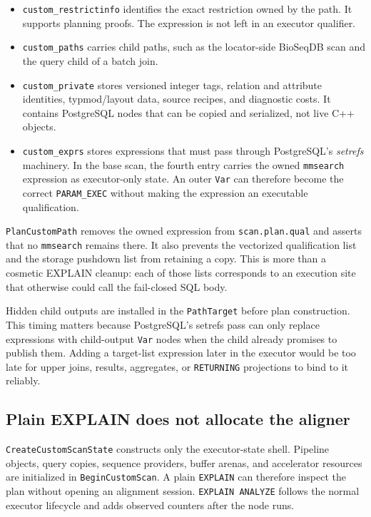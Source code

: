\begin{itemize}
  \item \texttt{custom\_restrictinfo} identifies the exact restriction owned
  by the path.  It supports planning proofs.  The expression is not left in an
  executor qualifier.
  \item \texttt{custom\_paths} carries child paths, such as the locator-side
  BioSeqDB scan and the query child of a batch join.
  \item \texttt{custom\_private} stores versioned integer tags, relation and
  attribute identities, typmod/layout data, source recipes, and diagnostic
  costs.  It contains PostgreSQL nodes that can be copied and serialized, not
  live C++ objects.
  \item \texttt{custom\_exprs} stores expressions that must pass through
  PostgreSQL's \emph{setrefs} machinery.  In the base scan, the fourth entry
  carries the owned \texttt{mmsearch} expression as executor-only state.  An
  outer \texttt{Var} can therefore become the correct \texttt{PARAM\_EXEC}
  without making the expression an executable qualification.
\end{itemize}

\texttt{PlanCustomPath} removes the owned expression from
\texttt{scan.plan.qual} and asserts that no \texttt{mmsearch} remains there.
It also prevents the vectorized qualification list and the storage pushdown
list from retaining a copy.  This is more than a cosmetic EXPLAIN cleanup:
each of those lists corresponds to an execution site that otherwise could
call the fail-closed SQL body.

Hidden child outputs are installed in the \texttt{PathTarget} before plan
construction.  This timing matters because PostgreSQL's setrefs pass can only
replace expressions with child-output \texttt{Var} nodes when the child
already promises to publish them.  Adding a target-list expression later in
the executor would be too late for upper joins, results, aggregates, or
\texttt{RETURNING} projections to bind to it reliably.

\subsection{Plain EXPLAIN does not allocate the aligner}

\texttt{CreateCustomScanState} constructs only the executor-state shell.
Pipeline objects, query copies, sequence providers, buffer arenas, and
accelerator resources are initialized in \texttt{BeginCustomScan}.  A plain
\texttt{EXPLAIN} can therefore inspect the plan without opening an alignment
session.  \texttt{EXPLAIN ANALYZE} follows the normal executor lifecycle and
adds observed counters after the node runs.

